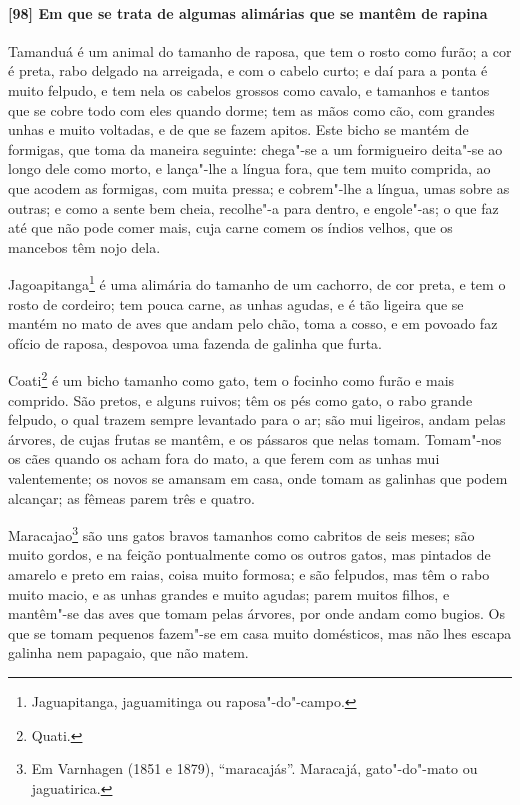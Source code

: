 \begin{linenumbers}
\paragraph{[98] Em que se trata de algumas alimárias que se mantêm de rapina}\quad
Tamanduá é um animal do tamanho de raposa, que tem o rosto como furão; a cor é preta, rabo
delgado na arreigada, e com o cabelo curto; e daí para a ponta é muito felpudo, e tem nela
os cabelos grossos como cavalo, e tamanhos e tantos que se cobre todo com eles quando
dorme; tem as mãos como cão, com grandes unhas e muito voltadas, e de que se fazem apitos.
Este bicho se mantém de formigas, que toma da maneira seguinte: chega"-se a um formigueiro
deita"-se ao longo dele como morto, e lança"-lhe a língua fora, que tem muito comprida, ao
que acodem as formigas, com muita pressa; e cobrem"-lhe a língua, umas sobre as outras; e
como a sente bem cheia, recolhe"-a para dentro, e engole"-as; o que faz até que não pode
comer mais, cuja carne comem os índios velhos, que os mancebos têm nojo dela.

Jagoapitanga\footnote{ Jaguapitanga, jaguamitinga ou raposa"-do"-campo.} é uma alimária do
tamanho de um cachorro, de cor preta, e tem o rosto de cordeiro; tem pouca carne, as unhas
agudas, e é tão ligeira que se mantém no mato de aves que andam pelo chão, toma a cosso, e
em povoado faz ofício de raposa, despovoa uma fazenda de galinha que furta.

Coati\footnote{ Quati.} é um bicho tamanho como gato, tem o focinho como furão e mais
comprido. São pretos, e alguns ruivos; têm os pés como gato, o rabo grande felpudo, o qual
trazem sempre levantado para o ar; são mui ligeiros, andam pelas árvores, de cujas frutas
se mantêm, e os pássaros que nelas tomam. Tomam"-nos os cães quando os acham fora do mato,
a que ferem com as unhas mui valentemente; os novos se amansam em casa, onde tomam as
galinhas que podem alcançar; as fêmeas parem três e quatro.

Maracajao\footnote{Em Varnhagen (1851 e 1879), ``maracajás''. Maracajá, gato"-do"-mato ou
jaguatirica.} são uns gatos bravos tamanhos como cabritos de seis meses; são muito gordos,
e na feição pontualmente como os outros gatos, mas pintados de amarelo e preto em raias,
coisa muito formosa; e são felpudos, mas têm o rabo muito macio, e as unhas grandes e
muito agudas; parem muitos filhos, e mantêm"-se das aves que tomam pelas árvores, por onde
andam como bugios. Os que se tomam pequenos fazem"-se em casa muito domésticos, mas não
lhes escapa galinha nem papagaio, que não matem.



\end{linenumbers}
